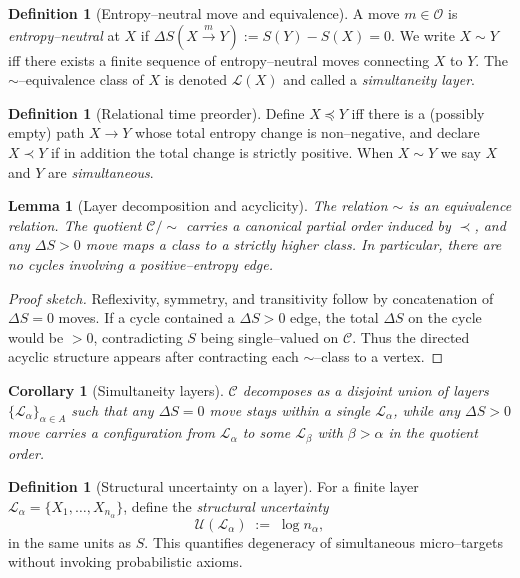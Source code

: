 \documentclass[11pt]{article}
\theoremstyle{plain}
\newtheorem{lemma}[theorem]{Lemma}
\newtheorem{corollary}[theorem]{Corollary}
\theoremstyle{definition}
\newtheorem{definition}[theorem]{Definition}
\begin{document}
\begin{definition}[Entropy–neutral move and equivalence]
  A move $m\in\mathcal{O}$ is \emph{entropy–neutral} at $X$ if $\Delta S(X\xrightarrow{m}Y):=S(Y)-S(X)=0$.
  We write $X\sim Y$ iff there exists a finite sequence of entropy–neutral moves connecting $X$ to $Y$.
  The $\sim$–equivalence class of $X$ is denoted $\mathcal{L}(X)$ and called a \emph{simultaneity layer}.
\end{definition}

\begin{definition}[Relational time preorder]
  Define $X\preceq Y$ iff there is a (possibly empty) path $X\to Y$ whose total entropy change is non–negative, and declare $X\prec Y$ if in addition the total change is strictly positive.  When $X\sim Y$ we say $X$ and $Y$ are \emph{simultaneous}.
\end{definition}

\begin{lemma}[Layer decomposition and acyclicity]\label{lem:layers}
  The relation $\sim$ is an equivalence relation.  The quotient $\mathcal{C}/\!\sim$ carries a canonical partial order induced by $\prec$, and any $\Delta S>0$ move maps a class to a strictly higher class.  In particular, there are no cycles involving a positive–entropy edge.
\end{lemma}

\begin{proof}[Proof sketch]
  Reflexivity, symmetry, and transitivity follow by concatenation of $\Delta S=0$ moves.
  If a cycle contained a $\Delta S>0$ edge, the total $\Delta S$ on the cycle would be $>0$, contradicting $S$ being single–valued on $\mathcal{C}$.
  Thus the directed acyclic structure appears after contracting each $\sim$–class to a vertex.
\end{proof}

\begin{corollary}[Simultaneity layers]\label{cor:simul}
  $\mathcal{C}$ decomposes as a disjoint union of layers $\{\mathcal{L}_\alpha\}_{\alpha\in A}$ such that any $\Delta S=0$ move stays within a single $\mathcal{L}_\alpha$, while any $\Delta S>0$ move carries a configuration from $\mathcal{L}_\alpha$ to some $\mathcal{L}_\beta$ with $\beta>\alpha$ in the quotient order.
\end{corollary}

\begin{definition}[Structural uncertainty on a layer]
  For a finite layer $\mathcal{L}_\alpha=\{X_1,\dots,X_{n_\alpha}\}$, define the \emph{structural uncertainty}
  \[
    \mathcal{U}(\mathcal{L}_\alpha)\;:=\;\log n_\alpha,
  \]
  in the same units as $S$.  This quantifies degeneracy of simultaneous micro–targets without invoking probabilistic axioms.
\end{definition}
\end{document}
